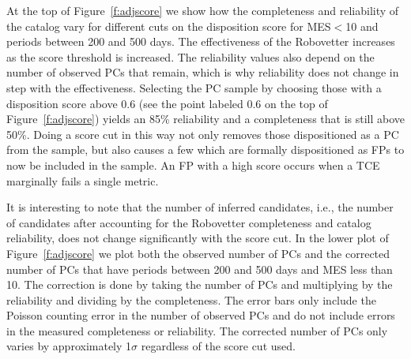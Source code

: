 At the top of Figure~\ref{f:adjscore} we show how the completeness and reliability of the catalog vary for different cuts on the disposition score for MES$<$10 and periods between 200 and 500 days. The effectiveness of the Robovetter increases as the score threshold is increased. The reliability values also depend on the number of observed PCs that remain, which is why reliability does not change in step with the effectiveness. Selecting the PC sample by choosing those with a disposition score above 0.6 (see the point labeled 0.6 on the top of Figure~\ref{f:adjscore}) yields an 85\% reliability and a completeness that is still above 50\%. Doing a score cut in this way not only removes those dispositioned as a PC from the sample, but also causes a few  which are formally dispositioned as FPs to now be included in the sample. An FP with a high score occurs when a TCE marginally fails a single metric.  

It is interesting to note that the number of inferred candidates, i.e., the number of candidates after accounting for the Robovetter completeness and catalog reliability, does not change significantly with the score cut. In the lower plot of Figure~\ref{f:adjscore} we plot both the observed number of PCs and the corrected number of PCs that have periods between 200 and 500 days and MES less than 10.  The correction is done by taking the number of PCs and multiplying by the reliability and dividing by the completeness.  The error bars only include the Poisson counting error in the number of observed PCs and do not include errors in the measured completeness or reliability. The corrected number of PCs only varies by approximately 1$\sigma$ regardless of the score cut used.   

